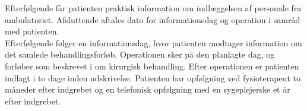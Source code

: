 Efterfølgende får patienten praktisk information om indlæggelsen af personale fra ambulatoriet. Afsluttende aftales dato for informationsdag og operation i samråd med patienten. \citep{pritka2015} \\
Efterfølgende følger en informationsdag, hvor patienten modtager information om det samlede behandlingsforløb. Operationen sker på den planlagte dag, og forløber som beskrevet i  om kirurgisk behandling. Efter operationen er patienten indlagt i to dage inden udskrivelse. Patienten har opfølgning ved fysioterapeut to måneder efter indgrebet og en telefonisk opfølgning med en sygeplejerske et år efter indgrebet. \citep{pritka2015}

